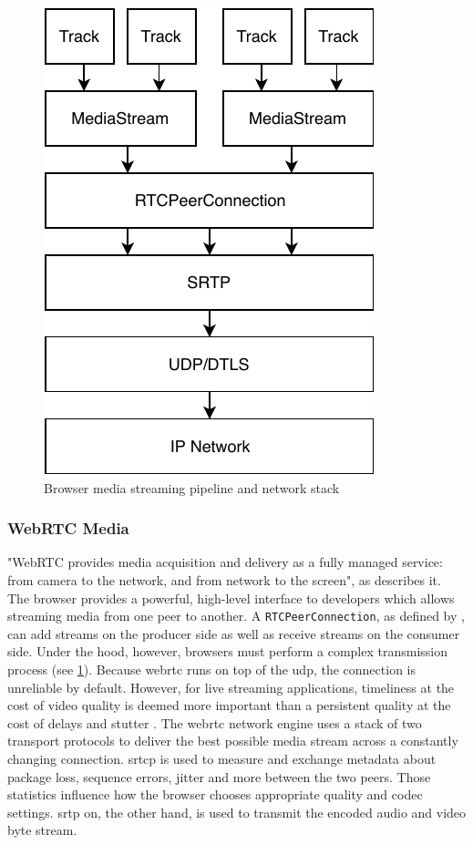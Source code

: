 \begin{figure}
\centering
\includegraphics[width=.5\textwidth]{graphics/media-stream-pipeline.pdf}
\caption{Browser media streaming pipeline and network stack}
\label{fig:pipeline}
\end{figure}

\subsubsection{WebRTC Media}
\label{subsec:webrtc-media}

"WebRTC provides media acquisition and delivery as a fully managed service: from camera to the network, and from network to the screen", as \citet[\S18.5]{high-performance-browser-networking} describes it. The browser provides a powerful, high-level interface to developers which allows streaming media from one peer to another. A \lstinline|RTCPeerConnection|, as defined by \citet[\S4.4]{webrtc-w3c}, can add streams on the producer side as well as receive streams on the consumer side. Under the hood, however, browsers must perform a complex transmission process (see \cref{fig:pipeline}). Because \gls{webrtc} runs on top of the \gls{udp}, the connection is unreliable by default. However, for live streaming applications, timeliness at the cost of video quality is deemed more important than a persistent quality at the cost of delays and stutter \cite[\S18.3]{high-performance-browser-networking}. The \gls{webrtc} network engine uses a stack of two transport protocols to deliver the best possible media stream across a constantly changing connection. \Gls{srtcp} is used to measure and exchange metadata about package loss, sequence errors, jitter and more between the two peers. Those statistics influence how the browser chooses appropriate quality and codec settings. \gls{srtp} on, the other hand, is used to transmit the encoded audio and video byte stream.

